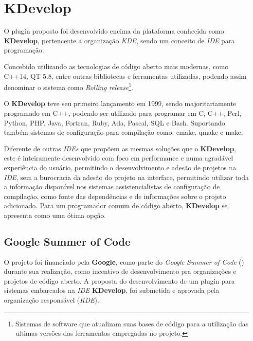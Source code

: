 
\section{KDevelop}
O plugin proposto foi desenvolvido encima da plataforma conhecida como \textbf{KDevelop}, pertencente a organização \textit{KDE},
sendo um conceito de \textit{IDE} para programação.

Concebido utilizando as tecnologias de código aberto mais modernas, como C++14, QT 5.8, entre outras bibliotecas e ferramentas
utilizadas, podendo assim denominar o sistema como \textit{Rolling release}\footnote{Sistemas de software que atualizam suas bases
de código para a utilização das ultimas versões das ferramentas empregadas no projeto.}.

O \textbf{KDevelop} teve seu primeiro lançamento em 1999, sendo majoritariamente programado em C++, podendo ser utilizado
para programar em C, C++, Perl, Python, PHP, Java, Fortran, Ruby, Ada, Pascal, SQL e Bash. Suportando também sistemas de
configuração para compilação como: cmake, qmake e make.

Diferente de outras \textit{IDEs} que propõem as mesmas soluções que o \textbf{KDevelop}, este é inteiramente desenvolvido
com foco em performance e numa agradável experiência do usuário, permitindo o desenvolvimento e adesão de projetos na \textit{IDE},
sem a burocracia da adesão do projeto na interface, permitindo utilizar toda a informação disponível nos sistemas assistencialistas
de configuração de compilação, como fonte das dependências e de informações sobre o projeto adicionado. Para um programador comum
de código aberto, \textbf{KDevelop} se apresenta como uma ótima opção.


\subsection{Google Summer of Code}
O projeto foi financiado pela \textbf{Google}, como parte do \textit{Google Summer of Code} () durante
sua realização, como incentivo de desenvolvimento pra organizações e projetos de código aberto. A proposta do desenvolvimento
de um plugin para sistemas embarcados na \textit{IDE} \textbf{KDevelop}, foi submetida e aprovada pela organização
responsável (\textit{KDE}).

